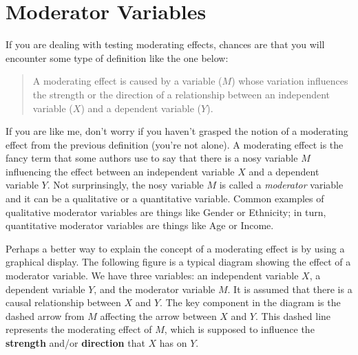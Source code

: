 \documentclass[12pt]{book}\usepackage{graphicx, color}
\begin{document}
\section{Moderator Variables}
If you are dealing with testing moderating effects, chances are that you will encounter some type of definition like the one below:

\begin{quotation} \noindent
A moderating effect is caused by  a variable ($M$) whose variation influences the strength or the direction of a relationship between an independent variable ($X$) and a dependent variable ($Y$). 
\end{quotation}

If you are like me, don't worry if you haven't grasped the notion of a moderating effect from the previous definition (you're not alone). A moderating effect is the fancy term that some authors use to say that there is a nosy variable $M$ influencing the effect between an independent variable $X$ and a dependent variable $Y$. Not surprinsingly, the nosy variable $M$ is called a \textit{moderator} variable and it can be a qualitative or a quantitative variable. Common examples of qualitative moderator variables are things like Gender or Ethnicity; in turn, quantitative moderator variables are things like Age or Income.

Perhaps a better way to explain the concept of a moderating effect is by using a graphical display. The following figure is a typical diagram showing the effect of a moderator variable. We have three variables: an independent variable $X$, a dependent variable $Y$, and the moderator variable $M$. It is assumed that there is a causal relationship between $X$ and $Y$. The key component in the diagram is the dashed arrow from $M$ affecting the arrow between $X$ and $Y$. This dashed line represents the moderating effect of $M$, which is supposed to influence the \textbf{strength} and/or \textbf{direction} that $X$ has on $Y$.
\end{document}
